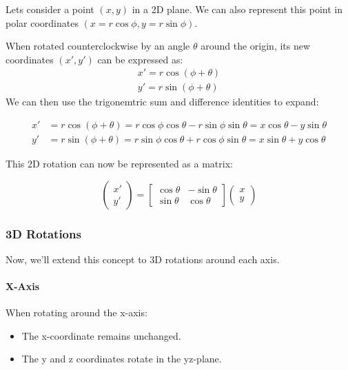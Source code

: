 \documentclass[12pt]{article}
\begin{document}
Lets consider a point $(x, y)$ in a 2D plane. We can also represent this point in polar coordinates $(x = r \cos\phi,  y = r \sin\phi)$.

When rotated counterclockwise by an angle $\theta$ around the origin, its new coordinates $(x', y')$ can be expressed as:
$$
    \begin{aligned}
        x' = r \cos(\phi + \theta) \\
        y' = r \sin(\phi + \theta)
    \end{aligned}
$$
We can then use the trigonemtric sum and difference identities to expand:

$$
    \begin{aligned}
        x' & = r \cos(\phi + \theta) = r \cos\phi \cos\theta - r \sin\phi \sin\theta = x \cos\theta - y \sin\theta \\
        y' & = r \sin(\phi + \theta) = r \sin\phi \cos\theta + r \cos\phi \sin\theta = x \sin\theta + y \cos\theta
    \end{aligned}
$$

This 2D rotation can now be represented as a matrix:

$$
    \begin{pmatrix}
        x' \\ y'
    \end{pmatrix} =
    \begin{bmatrix}
        \cos\theta & -\sin\theta \\
        \sin\theta & \cos\theta
    \end{bmatrix}
    \begin{pmatrix}
        x \\ y
    \end{pmatrix}
$$

\subsubsection{3D Rotations}

Now, we'll extend this concept to 3D rotations around each axis.

\paragraph{X-Axis} When rotating around the x-axis:
\begin{itemize}
    \item The x-coordinate remains unchanged.
    \item The y and z coordinates rotate in the yz-plane.
\end{itemize}
\end{document}
